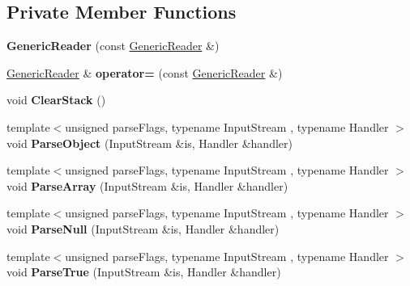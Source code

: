 \subsection*{Private Member Functions}
\begin{DoxyCompactItemize}
\item 
{\bfseries Generic\+Reader} (const \hyperlink{class_generic_reader}{Generic\+Reader} \&)\hypertarget{class_generic_reader_ac767384e34b7078fa9f97ba57c884328}{}\label{class_generic_reader_ac767384e34b7078fa9f97ba57c884328}

\item 
\hyperlink{class_generic_reader}{Generic\+Reader} \& {\bfseries operator=} (const \hyperlink{class_generic_reader}{Generic\+Reader} \&)\hypertarget{class_generic_reader_ab07a979626cfa121365bb09b61558c11}{}\label{class_generic_reader_ab07a979626cfa121365bb09b61558c11}

\item 
void {\bfseries Clear\+Stack} ()\hypertarget{class_generic_reader_a1c3db4c395db98714ffb257d559fb28e}{}\label{class_generic_reader_a1c3db4c395db98714ffb257d559fb28e}

\item 
{\footnotesize template$<$unsigned parse\+Flags, typename Input\+Stream , typename Handler $>$ }\\void {\bfseries Parse\+Object} (Input\+Stream \&is, Handler \&handler)\hypertarget{class_generic_reader_af7943451d58ae465e9803d5a78beeb90}{}\label{class_generic_reader_af7943451d58ae465e9803d5a78beeb90}

\item 
{\footnotesize template$<$unsigned parse\+Flags, typename Input\+Stream , typename Handler $>$ }\\void {\bfseries Parse\+Array} (Input\+Stream \&is, Handler \&handler)\hypertarget{class_generic_reader_a8f226bb3c17b232ce142594b7620c8a4}{}\label{class_generic_reader_a8f226bb3c17b232ce142594b7620c8a4}

\item 
{\footnotesize template$<$unsigned parse\+Flags, typename Input\+Stream , typename Handler $>$ }\\void {\bfseries Parse\+Null} (Input\+Stream \&is, Handler \&handler)\hypertarget{class_generic_reader_ae624956124c98a85d23decd86a406a0b}{}\label{class_generic_reader_ae624956124c98a85d23decd86a406a0b}

\item 
{\footnotesize template$<$unsigned parse\+Flags, typename Input\+Stream , typename Handler $>$ }\\void {\bfseries Parse\+True} (Input\+Stream \&is, Handler \&handler)\hypertarget{class_generic_reader_a762f074e0f99c71f0a82cff19bb763cd}{}\label{class_generic_reader_a762f074e0f99c71f0a82cff19bb763cd}


\end{DoxyCompactItemize}
